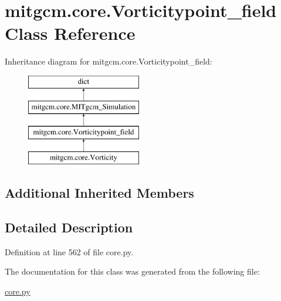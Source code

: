 \hypertarget{classmitgcm_1_1core_1_1Vorticitypoint__field}{\section{mitgcm.\+core.\+Vorticitypoint\+\_\+field Class Reference}
\label{classmitgcm_1_1core_1_1Vorticitypoint__field}
}
Inheritance diagram for mitgcm.\+core.\+Vorticitypoint\+\_\+field\+:\begin{figure}[H]
\begin{center}
\leavevmode
\includegraphics[height=4.000000cm]{classmitgcm_1_1core_1_1Vorticitypoint__field}
\end{center}
\end{figure}
\subsection*{Additional Inherited Members}


\subsection{Detailed Description}


Definition at line 562 of file core.\+py.



The documentation for this class was generated from the following file\+:\begin{DoxyCompactItemize}
\item 
\hyperlink{core_8py}{core.\+py}\end{DoxyCompactItemize}
